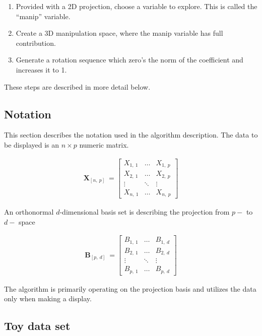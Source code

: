 \documentclass{monashthesis}
\begin{document}
\begin{enumerate}
\def\labelenumi{\arabic{enumi}.}
\tightlist
\item
  Provided with a 2D projection, choose a variable to explore. This is
  called the ``manip'' variable.
\item
  Create a 3D manipulation space, where the manip variable has full
  contribution.
\item
  Generate a rotation sequence which zero's the norm of the coefficient
  and increases it to 1.
\end{enumerate}

These steps are described in more detail below.

\subsection{Notation}\label{notation}

This section describes the notation used in the algorithm description.
The data to be displayed is an \(n \times p\) numeric matrix.

\begin{align*}
  \textbf{X}_{[n,~p]} ~=
  \begin{bmatrix}
    X_{1,~1} & \dots  & X_{1,~p} \\
    X_{2,~1} & \dots  & X_{2,~p} \\
    \vdots   & \ddots & \vdots   \\
    X_{n,~1} & \dots  & X_{n,~p}
  \end{bmatrix}
\end{align*}

An orthonormal \(d\)-dimensional basis set is describing the projection
from \(p-\) to \(d-\) space

\begin{align*}
  \textbf{B}_{[p,~d]} ~=
  \begin{bmatrix}
    B_{1,~1} & \dots  & B_{1,~d} \\
    B_{2,~1} & \dots  & B_{2,~d} \\
    \vdots   & \ddots & \vdots   \\
    B_{p,~1} & \dots  & B_{p,~d}
  \end{bmatrix}
\end{align*}

The algorithm is primarily operating on the projection basis and
utilizes the data only when making a display.

\subsection{Toy data set}\label{toy-data-set}
\end{document}
